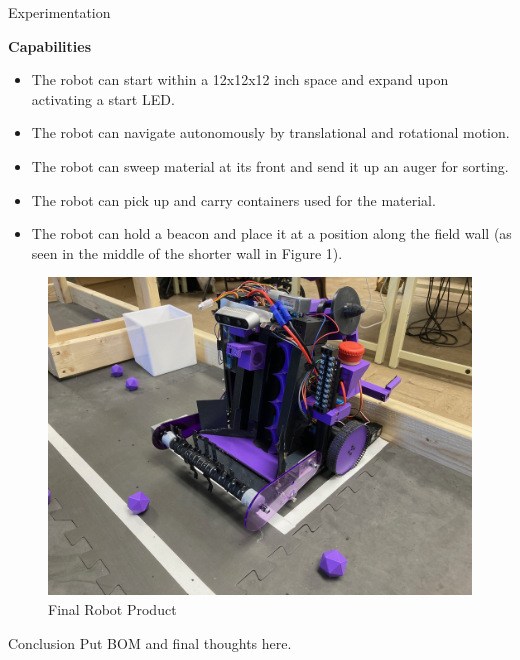 \documentclass[final]{beamer}
\newlength{\colwidth}
\begin{document}
\begin{frame}[t]
\begin{columns}[t]
\begin{column}{\colwidth}

    \begin{block}{Experimentation}
    \item \textbf{Capabilities}
        \begin{itemize}
          \item The robot can start within a 12x12x12 inch space and expand upon activating a start LED.
          \item The robot can navigate autonomously by translational and rotational motion.
          \item The robot can sweep material at its front and send it up an auger for sorting.
          \item The robot can pick up and carry containers used for the material.
          \item The robot can hold a beacon and place it at a position along the field wall (as seen in the middle of the shorter wall in Figure 1).
        \end{itemize}

    \begin{figure}
      \centering
      \includegraphics[width=20.0cm]{Robot_Practice_Field.jpg}
      \caption{Final Robot Product}
    \end{figure}

  \end{block}


  \begin{block}{Conclusion}
    Put BOM and final thoughts here.



\end{block}
\end{column}
\end{columns}
\end{frame}
\end{document}
